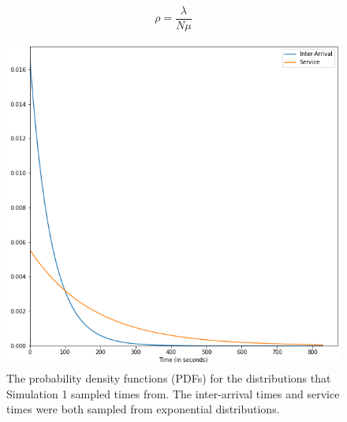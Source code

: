 \begin{equation}
\rho = \frac{\lambda}{N \mu}
\label{eq:occupancy}
\end{equation}

\begin{figure}[H]
  \includegraphics[width=\textwidth]{figures/montecarlo/expon_expon.png}
  \caption{
    The probability density functions (PDFs) for the distributions that
    Simulation 1 sampled times from.
    The inter-arrival times and service times were both sampled from
    exponential distributions.
  }\label{fig:simple_sim1_dists}
\end{figure}


